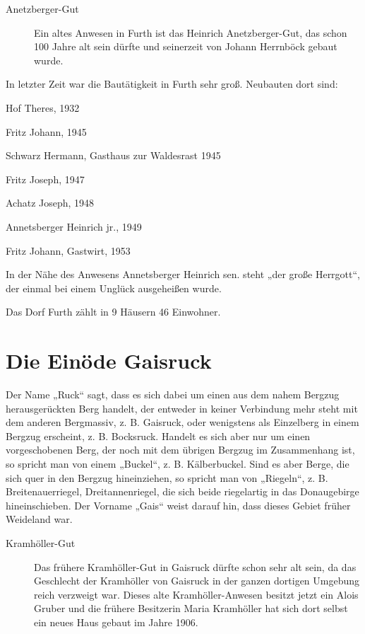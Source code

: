 \documentclass{book}
\begin{document}
\begin{description}
\item[Anetzberger-Gut] Ein altes Anwesen in Furth ist das Heinrich
Anetzberger-Gut, das schon 100 Jahre alt sein dürfte und seinerzeit von
Johann Herrnböck gebaut wurde.
\end{description}

In letzter Zeit war die Bautätigkeit in Furth sehr groß. Neubauten dort
sind:

\begin{compactitem}
\item Hof Theres, 1932
\item Fritz Johann, 1945
\item Schwarz Hermann, Gasthaus zur Waldesrast 1945
\item Fritz Joseph, 1947
\item Achatz Joseph, 1948
\item Annetsberger Heinrich jr., 1949
\item Fritz Johann, Gastwirt, 1953
\end{compactitem}

In der Nähe des Anwesens Annetsberger Heinrich sen. steht „der große
Herrgott“, der einmal bei einem Unglück ausgeheißen wurde.

Das Dorf Furth zählt in 9 Häusern 46 Einwohner.

\section{Die Einöde Gaisruck}

Der Name „Ruck“ sagt, dass es sich dabei um einen aus dem nahem Bergzug
herausgerückten Berg handelt, der entweder in keiner Verbindung mehr
steht mit dem anderen Bergmassiv, z. B. Gaisruck, oder wenigstens als
Einzelberg in einem Bergzug erscheint, z. B. Bocksruck. Handelt es sich
aber nur um einen vorgeschobenen Berg, der noch mit dem übrigen Bergzug
im Zusammenhang ist, so spricht man von einem „Buckel“, z. B.
Kälberbuckel. Sind es aber Berge, die sich quer in den Bergzug
hineinziehen, so spricht man von „Riegeln“, z. B. Breitenauerriegel,
Dreitannenriegel, die sich beide riegelartig in das Donaugebirge
hineinschieben. Der Vorname „Gais“ weist darauf hin, dass dieses Gebiet
früher Weideland war.

\begin{description}
\item[Kramhöller-Gut] Das frühere Kramhöller-Gut in Gaisruck dürfte
schon sehr alt sein, da das Geschlecht der Kramhöller von Gaisruck in
der ganzen dortigen Umgebung reich verzweigt war. Dieses alte
Kramhöller-Anwesen besitzt jetzt ein Alois Gruber und die frühere
Besitzerin Maria Kramhöller hat sich dort selbst ein neues Haus gebaut
im Jahre 1906.
\end{description}
\end{document}
